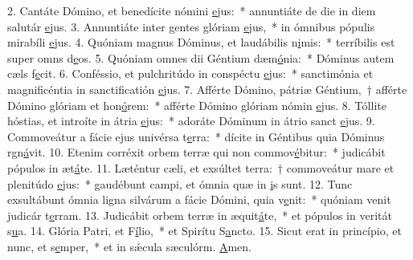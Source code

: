 2. Cantáte Dómino, et benedícite nómini \uline{e}jus:~* annuntiáte de die in diem salutár \uline{e}jus.
3. Annuntiáte inter gentes glóriam \uline{e}jus,~* in ómnibus pópulis mirabíli \uline{e}jus.
4. Quóniam magnus Dóminus, et laudábilis n\uline{i}mis:~* terríbilis est super omns d\uline{e}os.
5. Quóniam omnes dii Géntium dæm\uline{ó}nia:~* Dóminus autem cæls f\uline{e}cit.
6. Conféssio, et pulchritúdo in conspéctu \uline{e}jus:~* sanctimónia et magnificéntia in sanctificatión \uline{e}jus.
7. Afférte Dómino, pátriæ Géntium,~† afférte Dómino glóriam et hon\uline{ó}rem:~* afférte Dómino glóriam nómin \uline{e}jus.
8. Tóllite hóstias, et introíte in átria \uline{e}jus:~* adoráte Dóminum in átrio sanct \uline{e}jus.
9. Commoveátur a fácie ejus univérsa t\uline{e}rra:~* dícite in Géntibus quia Dóminus rgn\uline{á}vit.
10. Etenim corréxit orbem terræ qui non commov\uline{é}bitur:~* judicábit pópulos in æt\uline{á}te.
11. Læténtur cæli, et exsúltet terra:~† commoveátur mare et plenitúdo \uline{e}jus:~* gaudébunt campi, et ómnia quæ in \uline{i}s sunt.
12. Tunc exsultábunt ómnia ligna silvárum a fácie Dómini, quia v\uline{e}nit:~* quóniam venit judicár t\uline{e}rram.
13. Judicábit orbem terræ in æquit\uline{á}te,~* et pópulos in veritát s\uline{u}a.
14. Glória Patri, et F\uline{í}lio,~* et Spirítu S\uline{a}ncto.
15. Sicut erat in princípio, et nunc, et s\uline{e}mper,~* et in sǽcula sæculórm. \uline{A}men.
